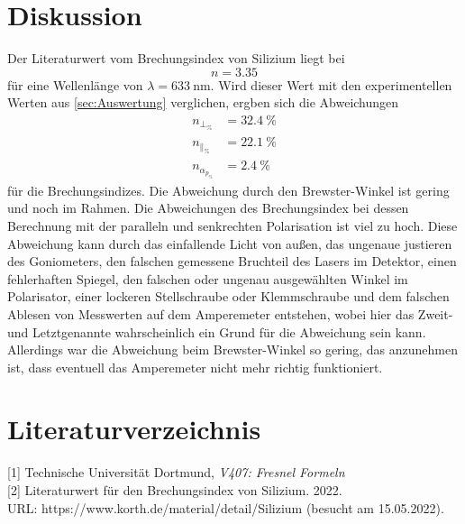 \section{Diskussion}
\label{sec:Diskussion}
Der Literaturwert vom Brechungsindex von Silizium liegt bei 
\begin{equation*}
  n=3.35
\end{equation*}
für eine Wellenlänge von $\lambda=633\ \textrm{nm}$. Wird dieser Wert mit den experimentellen Werten aus \autoref{sec:Auswertung} verglichen, ergben sich die Abweichungen
\begin{align*}
  n_{\bot_\%}&=32.4\ \%\\
  n_{\|_\%}&=22.1\ \%\\
  n_{\alpha_{p_\%}}&=2.4\ \%
\end{align*}
für die Brechungsindizes. Die Abweichung durch den Brewster-Winkel ist gering und noch im Rahmen. Die Abweichungen des Brechungsindex bei dessen Berechnung mit der paralleln und senkrechten Polarisation ist viel zu hoch. Diese Abweichung kann durch das einfallende Licht von außen, das ungenaue justieren des Goniometers, den falschen gemessene Bruchteil des Lasers im Detektor, einen fehlerhaften Spiegel, den falschen oder ungenau ausgewählten Winkel im Polarisator, einer lockeren Stellschraube oder Klemmschraube und dem falschen Ablesen von Messwerten auf dem Amperemeter entstehen, wobei hier das Zweit- und Letztgenannte wahrscheinlich ein Grund für die Abweichung sein kann. Allerdings war die Abweichung beim Brewster-Winkel so gering, das anzunehmen ist, dass eventuell das Amperemeter nicht mehr richtig funktioniert. 

\section{Literaturverzeichnis} 
[1] Technische Universität Dortmund, \textit{V407: Fresnel Formeln}\\

[2] Literaturwert für den Brechungsindex von Silizium. 2022.\\ 
URL: https://www.korth.de/material/detail/Silizium (besucht am 15.05.2022).



